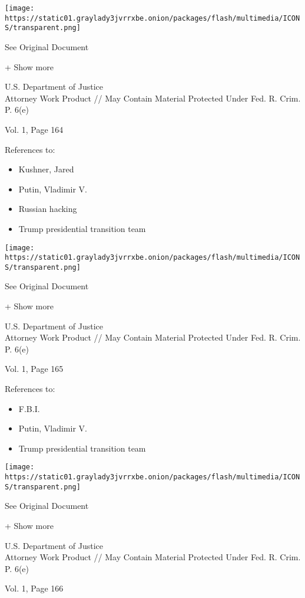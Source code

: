 \protect\hyperlink{}{}

\texttt{[image: https://static01.graylady3jvrrxbe.onion/packages/flash/multimedia/ICONS/transparent.png]}

See Original Document

+ Show more

U.S. Department of Justice\\
Attorney Work Product // May Contain Material Protected Under Fed. R.
Crim. P. 6(e)

Vol. 1, Page 164

References to:

\begin{itemize}
\tightlist
\item
  Kushner, Jared
\item
  Putin, Vladimir V.
\item
  Russian hacking
\item
  Trump presidential transition team
\end{itemize}

\protect\hyperlink{}{}

\texttt{[image: https://static01.graylady3jvrrxbe.onion/packages/flash/multimedia/ICONS/transparent.png]}

See Original Document

+ Show more

U.S. Department of Justice\\
Attorney Work Product // May Contain Material Protected Under Fed. R.
Crim. P. 6(e)

Vol. 1, Page 165

References to:

\begin{itemize}
\tightlist
\item
  F.B.I.
\item
  Putin, Vladimir V.
\item
  Trump presidential transition team
\end{itemize}

\protect\hyperlink{}{}

\texttt{[image: https://static01.graylady3jvrrxbe.onion/packages/flash/multimedia/ICONS/transparent.png]}

See Original Document

+ Show more

U.S. Department of Justice\\
Attorney Work Product // May Contain Material Protected Under Fed. R.
Crim. P. 6(e)

Vol. 1, Page 166

